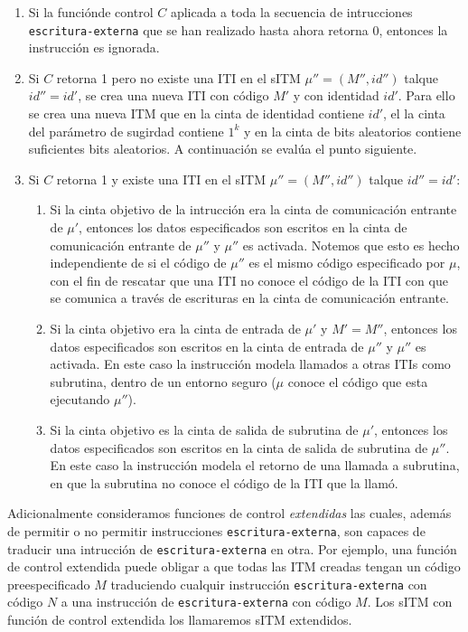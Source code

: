\begin{enumerate}
    \item Si la funciónde control $C$ aplicada a toda la secuencia de intrucciones \texttt{escritura-externa}
          que se han realizado hasta ahora retorna 0, entonces la instrucción es ignorada.
    \item Si $C$ retorna 1 pero no existe una ITI en el sITM $\mu'' = (M'', id'')$ talque $id''=id'$, se
          crea una nueva ITI con código $M'$ y con identidad $id'$. Para ello se crea una nueva ITM
          que en la cinta de identidad contiene $id'$, el la cinta del parámetro de sugirdad contiene $1^k$
          y en la cinta de bits aleatorios contiene suficientes bits aleatorios. A continuación se evalúa
          el punto siguiente.
    \item Si $C$ retorna 1 y existe una ITI en el sITM $\mu'' = (M'', id'')$ talque $id''=id'$:
    \begin{enumerate}
        \item Si la cinta objetivo de la intrucción era la cinta de comunicación entrante de $\mu'$, entonces
              los datos especificados son escritos en la cinta de comunicación entrante de $\mu''$ y $\mu''$
              es activada. Notemos que esto es hecho independiente de si el código de $\mu''$ es el mismo
              código especificado por $\mu$, con el fin de rescatar que una ITI no conoce el código de la
              ITI con que se comunica a través de escrituras en la cinta de comunicación entrante.
        \item Si la cinta objetivo era la cinta de entrada de $\mu'$ y $M' = M''$, entonces los datos
              especificados son escritos en la cinta de entrada de $\mu''$ y $\mu''$ es activada. En este caso
              la instrucción modela llamados a otras ITIs como subrutina, dentro de un entorno seguro ($\mu$
              conoce el código que esta ejecutando $\mu''$).
        \item Si la cinta objetivo es la cinta de salida de subrutina de $\mu'$, entonces los datos
              especificados son escritos en la cinta de salida de subrutina de $\mu''$. En este caso la
              instrucción modela el retorno de una llamada a subrutina, en que la subrutina no conoce
              el código de la ITI que la llamó.
    \end{enumerate}
\end{enumerate}

Adicionalmente consideramos funciones de control \textit{extendidas} las cuales, además de permitir
o no permitir instrucciones \texttt{escritura-externa}, son capaces de traducir una intrucción de
\texttt{escritura-externa} en otra. Por ejemplo, una función de control extendida puede obligar
a que todas las ITM creadas tengan un código preespecificado $M$ traduciendo cualquir instrucción
\texttt{escritura-externa} con código $N$ a una instrucción de \texttt{escritura-externa} con código
$M$. Los sITM con función de control extendida los llamaremos sITM extendidos.\\

